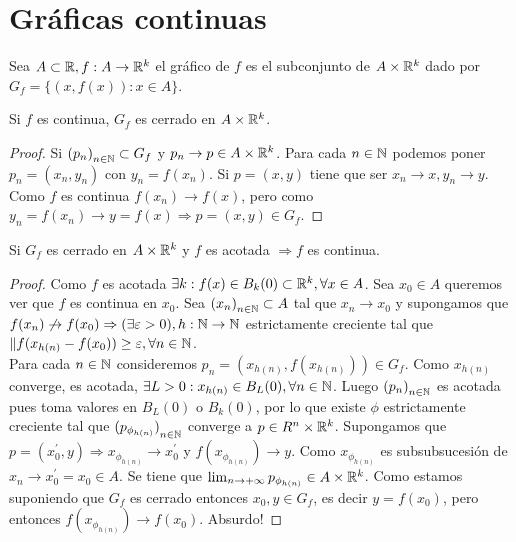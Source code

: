 \section{Gráficas continuas}

\begin{definition}
  Sea \(A \subset \mathbb{R}, f: A \to \mathbb{R}^k\) el gráfico de \(f\) es el subconjunto de \(A \times \mathbb{R}^k\) dado por \(G_f = \{ (x, f(x)) : x \in A \} \).
\end{definition}

\begin{prop}
  Si \(f\) es continua, \(G_f\) es cerrado en \(A \times \mathbb{R}^k\).
  \begin{proof}
    Si \({(p_n)}_{n \in \mathbb{N}} \subset G_f\) y \(p_n \to p \in A \times \mathbb{R}^k\). Para cada \(n \in \mathbb{N} \) podemos poner \(p_n = (x_n, y_n)\) con \(y_n = f(x_n)\). Si \(p = (x, y)\) tiene que ser \(x_n \to x, y_n \to y\). Como \(f\) es continua \(f(x_n) \to f(x)\), pero como \(y_n = f(x_n) \to y = f(x) \Rightarrow p = (x, y) \in G_f\).
  \end{proof}
\end{prop}

\begin{prop}
  Si \(G_f\) es cerrado en \(A \times \mathbb{R}^k\) y \(f\) es acotada \(\Rightarrow f\) es continua.
  \begin{proof}
    Como \(f\) es acotada \(\exists k : f(x) \in B_k(0) \subset \mathbb{R}^k, \forall x \in A\). Sea \(x_0 \in A\) queremos ver que \(f\) es continua en \(x_0\). Sea \({(x_n)}_{n \in \mathbb{N}} \subset A\) tal que \(x_n \to x_0\) y supongamos que \(f(x_n) \not \to f(x_0) \Rightarrow (\exists \varepsilon > 0), h: \mathbb{N} \to \mathbb{N} \) estrictamente creciente tal que \( \|f(x_{h(n)} - f(x_0)) \geq \varepsilon, \forall n \in \mathbb{N} \). \\
    Para cada \(n \in \mathbb{N} \) consideremos \(p_n = (x_{h(n)}, f(x_{h(n)})) \in G_f\). Como \(x_{h(n)} \) converge, es acotada, \(\exists L > 0 : x_{h(n)} \in B_L(0), \forall n \in \mathbb{N} \). Luego \({(p_n)}_{n \in \mathbb{N}} \) es acotada pues toma valores en \(B_L(0)\) o \(B_k(0)\), por lo que existe \(\phi \) estrictamente creciente tal que \({(p_{\phi_{h(n)}})}_{n \in \mathbb{N}} \) converge a \(p \in R^n \times \mathbb{R}^k\).
    Supongamos que \(p = (x_0^{\prime}, y) \Rightarrow x_{\phi_{h(n)}} \to x_0^{\prime} \) y \(f(x_{\phi_{h(n)}}) \to y\). Como \(x_{\phi_{h(n)}} \) es subsubsucesión de \(x_n \to x_0^{\prime} = x_0 \in A\). Se tiene que \(\lim_{n \to +\infty} p_{\phi_{h(n)}} \in A \times \mathbb{R}^k\). Como estamos suponiendo que \(G_f\) es cerrado entonces \(x_0, y \in G_f\), es decir \(y = f(x_0)\), pero entonces \(f(x_{\phi_{h(n)}}) \to f(x_0)\). Absurdo!
  \end{proof}
\end{prop}

